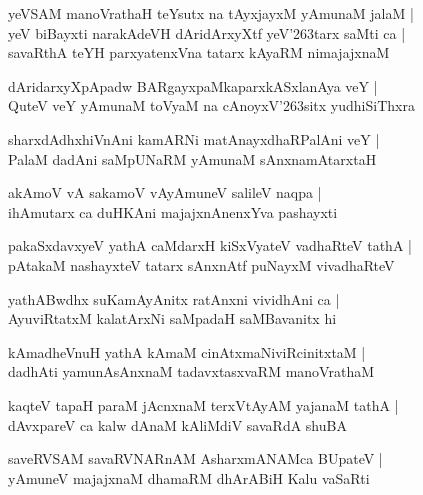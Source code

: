 \documentclass[twoside,12pt,openright]{book}
\def\S{\char'263}
\newcounter{shloka}[chapter]
\begin{document}
\begin{shloka}
yeVSAM manoVrathaH teYsutx na tAyxjayxM yAmunaM jalaM |\\
yeV biBayxti narakAdeVH dAridArxyXtf yeV\S tarx saMti ca |\\
savaRthA teYH parxyatenxVna tatarx kAyaRM  nimajajxnaM 
\end{shloka}

\begin{shloka}
dAridarxyXpApadw BARgayxpaMkaparxkASxlanAya veY |\\
QuteV veY yAmunaM toVyaM na cAnoyxV\S sitx yudhiSiThxra
\end{shloka}

\begin{shloka}
sharxdAdhxhiVnAni kamARNi matAnayxdhaRPalAni veY |\\
PalaM dadAni saMpUNaRM yAmunaM sAnxnamAtarxtaH 
\end{shloka}

\begin{shloka}
akAmoV vA sakamoV vAyAmuneV salileV naqpa |\\
ihAmutarx ca duHKAni majajxnAnenxYva pashayxti 
\end{shloka}

\begin{shloka}
pakaSxdavxyeV yathA caMdarxH kiSxVyateV vadhaRteV tathA |\\
pAtakaM nashayxteV tatarx sAnxnAtf puNayxM vivadhaRteV 
\end{shloka}

\begin{shloka}
yathABwdhx suKamAyAnitx ratAnxni vividhAni ca |\\
AyuviRtatxM kalatArxNi saMpadaH saMBavanitx hi 
\end{shloka}

\begin{shloka}
kAmadheVnuH yathA kAmaM cinAtxmaNiviRcinitxtaM |\\
dadhAti yamunAsAnxnaM tadavxtasxvaRM manoVrathaM 
\end{shloka}

\begin{shloka}
kaqteV tapaH paraM jAcnxnaM terxVtAyAM yajanaM tathA |\\
dAvxpareV ca kalw dAnaM kAliMdiV savaRdA shuBA
\end{shloka}

\begin{shloka}
saveRVSAM savaRVNARnAM AsharxmANAMca BUpateV |\\
yAmuneV majajxnaM dhamaRM dhArABiH Kalu vaSaRti 
\end{shloka}
\end{document}
